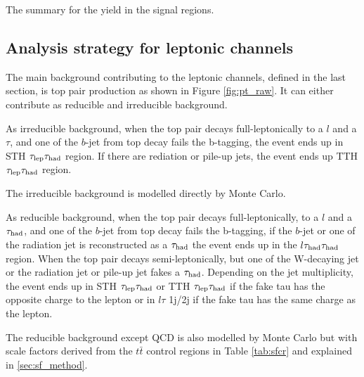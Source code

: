\begin{table}
\caption{The summary for the yield in the signal regions.}
\label{tab:yield_SR}
\small


\end{table}

\subsection{Analysis strategy for leptonic channels}

The main background contributing to the leptonic channels, defined in the last section, is top pair production as shown in Figure \ref{fig:pt_raw}. It can either contribute as reducible and irreducible background.

As irreducible background, when the top pair decays full-leptonically to a $l$ and a $\tau$, and one of the $b$-jet from top decay fails the b-tagging, the event ends up in STH $\tau_\text{lep}{}\tau_\text{had}$ region. If there are rediation or pile-up jets, the event ends up TTH $\tau_\text{lep}{}\tau_\text{had}$ region.

The irreducible background is modelled directly by Monte Carlo.

As reducible background, when the top pair decays full-leptonically, to a $l$ and a $\tau_\text{had}$, and one of the $b$-jet from top decay fails the b-tagging, if the $b$-jet or one of the radiation jet is reconstructed as a $\tau_\text{had}$ the event ends up in the $l\tau_\text{had}{}\tau_\text{had}$ region. When the top pair decays semi-leptonically, but one of the W-decaying jet or the radiation jet or pile-up jet fakes a $\tau_\text{had}$. Depending on the jet multiplicity, the event ends up in STH $\tau_\text{lep}{}\tau_\text{had}$ or TTH $\tau_\text{lep}{}\tau_\text{had}$ if the fake tau has the opposite charge to the lepton or in $l\tau$ 1j/2j if the fake tau has the same charge as the lepton. 

The reducible background except QCD is also modelled by Monte Carlo but with scale factors derived from the $t\bar{t}$ control regions in Table \ref{tab:sfcr} and explained in \ref{sec:sf_method}.

